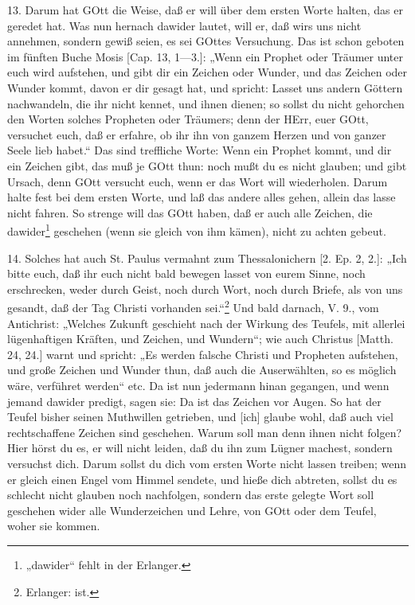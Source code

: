 13. Darum hat GOtt die Weise, daß er will über dem ersten Worte halten, das er geredet hat.
Was nun hernach dawider lautet, will er, daß wirs uns nicht annehmen, sondern gewiß seien, es sei GOttes Versuchung. Das ist schon geboten im fünften Buche Mosis [Cap. 13, 1—3.]: „Wenn ein Prophet oder Träumer unter euch wird aufstehen, und gibt dir ein Zeichen oder Wunder, und das Zeichen oder Wunder kommt, davon er dir gesagt hat, und spricht: Lasset uns andern Göttern nachwandeln, die ihr nicht kennet, und ihnen dienen; so sollst du nicht gehorchen den Worten solches Propheten oder Träumers; denn der HErr, euer GOtt, versuchet euch, daß er erfahre, ob ihr ihn von ganzem Herzen und von ganzer Seele lieb habet.“ Das sind treffliche Worte: Wenn ein Prophet kommt, und dir ein Zeichen gibt, das muß je GOtt thun: noch mußt du es nicht glauben; und gibt Ursach, denn GOtt versucht euch, wenn er das Wort will wiederholen. Darum halte fest bei dem ersten Worte, und laß das andere alles gehen, allein das lasse nicht fahren. So strenge will das GOtt haben, daß er auch alle Zeichen, die dawider\footnote{„dawider“ fehlt in der Erlanger.} geschehen (wenn sie gleich von ihm kämen), nicht zu achten gebeut.

14. Solches hat auch St. Paulus vermahnt zum Thessalonichern [2. Ep. 2, 2.]: „Ich bitte euch, daß ihr euch nicht bald bewegen lasset von eurem Sinne, noch erschrecken, weder durch Geist, noch durch Wort, noch durch Briefe, als von uns gesandt, daß der Tag Christi vorhanden sei.“\footnote{Erlanger: ist.} Und bald darnach, V. 9., vom Antichrist: „Welches Zukunft geschieht nach der Wirkung des Teufels, mit allerlei lügenhaftigen Kräften, und Zeichen, und Wundern“; wie auch Christus [Matth. 24, 24.] warnt und spricht: „Es werden falsche Christi und Propheten aufstehen, und große Zeichen und Wunder thun, daß auch die Auserwählten, so es möglich wäre, verführet werden“ etc. Da ist nun jedermann hinan gegangen, und wenn jemand dawider predigt, sagen sie: Da ist das Zeichen vor Augen. So hat der Teufel bisher seinen Muthwillen getrieben, und [ich] glaube wohl, daß auch viel rechtschaffene Zeichen sind geschehen. Warum soll man denn ihnen nicht folgen? Hier hörst du es, er will nicht leiden, daß du ihn zum Lügner machest, sondern versuchst dich. Darum sollst du dich vom ersten Worte nicht lassen treiben; wenn er gleich einen Engel vom Himmel sendete, und hieße dich abtreten, sollst du es schlecht nicht glauben noch nachfolgen, sondern das erste gelegte Wort soll geschehen wider alle Wunderzeichen und Lehre, von GOtt oder dem Teufel, woher sie kommen.

